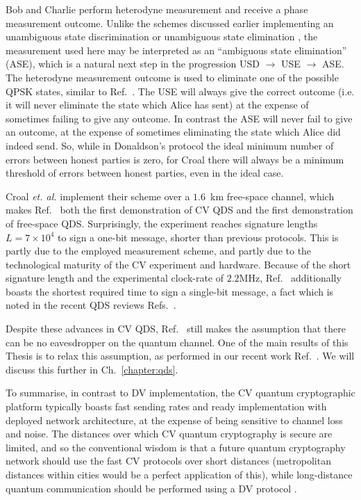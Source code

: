 Bob and Charlie perform heterodyne measurement and receive a phase measurement outcome. Unlike the schemes discussed earlier implementing an unambiguous state discrimination \cite{Dunjko2014} or unambiguous state elimination \cite{Donaldson2016}, the measurement used here may be interpreted as an ``ambiguous state elimination'' (ASE), which is a natural next step in the progression USD $\rightarrow$ USE $\rightarrow$ ASE. The heterodyne measurement outcome is used to eliminate one of the possible QPSK states, similar to Ref.~\cite{Donaldson2016}. The USE will always give the correct outcome (i.e. it will never eliminate the state which Alice has sent) at the expense of sometimes failing to give any outcome. In contrast the ASE will never fail to give an outcome, at the expense of sometimes eliminating the state which Alice did indeed send. So, while in Donaldson's protocol \cite{Donaldson2016} the ideal minimum number of errors between honest parties is zero, for Croal \cite{Croal2016} there will always be a minimum threshold of errors between honest parties, even in the ideal case.

Croal \emph{et. al.} implement their scheme over a $1.6$~km free-space channel, which makes Ref.~\cite{Croal2016} both the first demonstration of CV QDS and the first demonstration of free-space QDS. Surprisingly, the experiment reaches signature lengths $L = 7 \times 10^4$ to sign a one-bit message, shorter than previous protocols. This is partly due to the employed measurement scheme, and partly due to the technological maturity of the CV experiment and hardware. Because of the short signature length and the experimental clock-rate of $2.2$MHz, Ref.~\cite{Croal2016} additionally boasts the shortest required time to sign a single-bit message, a fact which is noted in the recent QDS reviews Refs.~\cite{Collins2016, Collins2018}.

Despite these advances in CV QDS, Ref.~\cite{Croal2016} still makes the assumption that there can be no eavesdropper on the quantum channel. One of the main results of this Thesis is to relax this assumption, as performed in our recent work Ref.~\cite{Thornton2019}. We will discuss this further in Ch.~\ref{chapter:qds}.

To summarise, in contrast to DV implementation, the CV quantum cryptographic platform typically boasts fast sending rates and ready implementation with deployed network architecture, at the expense of being sensitive to channel loss and noise. The distances over which CV quantum cryptography is secure are limited, and so the conventional wisdom is that a future quantum cryptography network should use the fast CV protocols over short distances (metropolitan distances within cities would be a perfect application of this), while long-distance quantum communication should be performed using a DV protocol \cite{Pirandola2015a}. %



